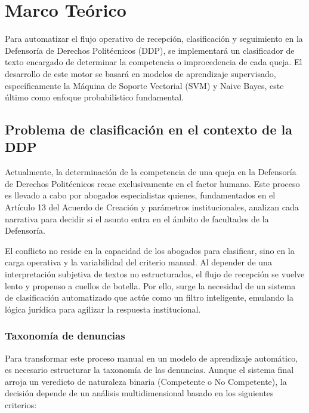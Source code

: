 \chapter{Marco Teórico}

Para automatizar el flujo operativo de recepción, clasificación y seguimiento en la Defensoría de Derechos Politécnicos (DDP), se implementará un clasificador de texto encargado de determinar la competencia o improcedencia de cada queja. El desarrollo de este motor se basará en modelos de aprendizaje supervisado, específicamente la Máquina de Soporte Vectorial (SVM) y Naive Bayes, este último como enfoque probabilístico fundamental.

\section{Problema de clasificación en el contexto de la DDP}

Actualmente, la determinación de la competencia de una queja en la Defensoría de Derechos Politécnicos recae exclusivamente en el factor humano. Este proceso es llevado a cabo por abogados especialistas quienes, fundamentados en el Artículo 13 del Acuerdo de Creación y parámetros institucionales, analizan cada narrativa para decidir si el asunto entra en el ámbito de facultades de la Defensoría.

El conflicto no reside en la capacidad de los abogados para clasificar, sino en la carga operativa y la variabilidad del criterio manual. Al depender de una interpretación subjetiva de textos no estructurados, el flujo de recepción se vuelve lento y propenso a cuellos de botella. Por ello, surge la necesidad de un sistema de clasificación automatizado que actúe como un filtro inteligente, emulando la lógica jurídica para agilizar la respuesta institucional.

\subsection{Taxonomía de denuncias}
Para transformar este proceso manual en un modelo de aprendizaje automático, es necesario estructurar la taxonomía de las denuncias. Aunque el sistema final arroja un veredicto de naturaleza binaria (Competente o No Competente), la decisión depende de un análisis multidimensional basado en los siguientes criterios:


